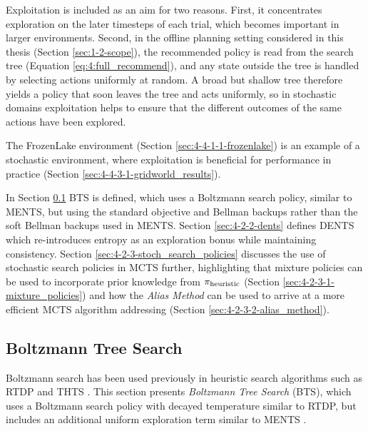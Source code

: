     Exploitation is included as an aim for two reasons. First, it concentrates exploration on the later timesteps of each trial, which becomes important in larger environments. Second, in the offline planning setting considered in this thesis (Section \mbox{\ref{sec:1-2-scope}}), the recommended policy is read from the search tree (Equation \mbox{\eqref{eq:4:full_recommend}}), and any state outside the tree is handled by selecting actions uniformly at random. A broad but shallow tree therefore yields a policy that soon leaves the tree and acts uniformly, so in stochastic domains exploitation helps to ensure that the different outcomes of the same actions have been explored. 
    
    The FrozenLake environment (Section \ref{sec:4-4-1-1-frozenlake}) is an example of a stochastic environment, where exploitation is beneficial for performance in practice (Section \ref{sec:4-4-3-1-gridworld_results}).

    In Section \ref{sec:4-2-1-bts} BTS is defined, which uses a Boltzmann search policy, similar to MENTS, but using the standard objective  and Bellman backups rather than the soft Bellman backups used in MENTS. Section \ref{sec:4-2-2-dents} defines DENTS which re-introduces entropy as an exploration bonus while maintaining consistency. Section \ref{sec:4-2-3-stoch_search_policies} discusses the use of stochastic search policies in MCTS further, highlighting that mixture policies can be used to incorporate prior knowledge from ${\pi_{\textnormal{heuristic}}}$ (Section \ref{sec:4-2-3-1-mixture_policies}) and how the \textit{Alias Method} can be used to arrive at a more efficient MCTS algorithm addressing \complexityq\ewe (Section \ref{sec:4-2-3-2-alias_method}).










\subsection{Boltzmann Tree Search}
\label{sec:4-2-1-bts}

    Boltzmann search has been used previously in heuristic search algorithms such as RTDP \cite{rtdp} and THTS \cite{thts_thesis}. This section presents \textit{Boltzmann Tree Search} (BTS), which uses a Boltzmann search policy with decayed temperature similar to RTDP, but includes an additional uniform exploration term similar to MENTS \cite{ments}.

